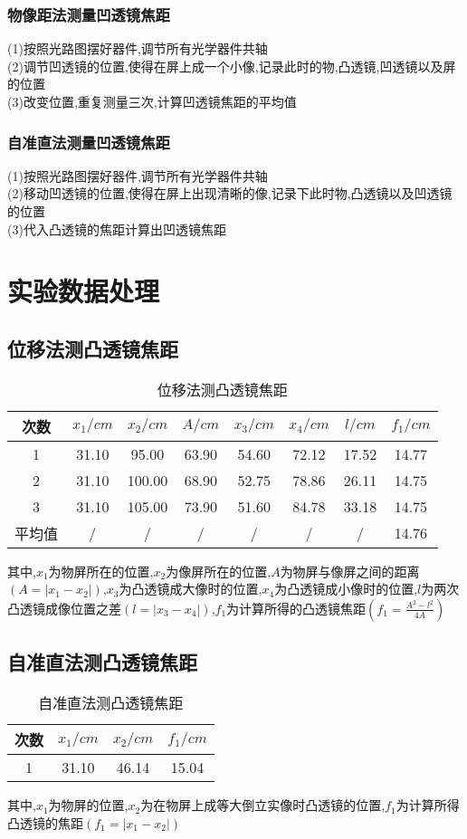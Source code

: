 \documentclass[a4 paper,12pt]{article}
\begin{document}
\subsubsection{物像距法测量凹透镜焦距}
\noindent
(1)按照光路图摆好器件,调节所有光学器件共轴\\
(2)调节凹透镜的位置,使得在屏上成一个小像,记录此时的物,凸透镜,凹透镜以及屏的位置\\
(3)改变位置,重复测量三次,计算凹透镜焦距的平均值
\subsubsection{自准直法测量凹透镜焦距}
\noindent
(1)按照光路图摆好器件,调节所有光学器件共轴\\
(2)移动凹透镜的位置,使得在屏上出现清晰的像,记录下此时物,凸透镜以及凹透镜的位置\\
(3)代入凸透镜的焦距计算出凹透镜焦距

\section{实验数据处理}

\subsection{位移法测凸透镜焦距}
\begin{table}[H] 
	\caption{位移法测凸透镜焦距}
	\label{位移法测凸透镜焦距}
	\centering
	\begin{tabular}{cccccccc}
		\toprule
		次数 & $x_{1}/cm$  & $x_{2}/cm $& $A/cm $ & $x_{3}/cm$  & $x_{4}/cm $ &$ l/cm$ & $f_{1}/cm $\\
		\midrule
		1 & 31.10  & 95.00  &63.90& 54.60  & 72.12&17.52&14.77  \\
		2 & 31.10  & 100.00  &68.90& 52.75  & 78.86&26.11&14.75  \\
		3 & 31.10  & 105.00  &73.90& 51.60  & 84.78&33.18&14.75  \\
		平均值&/&/&/&/&/&/&14.76  \\
		\bottomrule
	\end{tabular}
\end{table}
其中,$x_{1}$为物屏所在的位置,$x_{2}$为像屏所在的位置,$A$为物屏与像屏之间的距离$(A=|x_{1}-x_{2}|)$,$x_{3}$为凸透镜成大像时的位置,$x_{4}$为凸透镜成小像时的位置,$l$为两次凸透镜成像位置之差$(l=|x_{3}-x_{4}|)$,$f_{1}$为计算所得的凸透镜焦距$(f_{1}=\frac{A^{2}-l^{2}}{4A})$

\subsection{自准直法测凸透镜焦距}
\begin{table}[H] 
	\caption{自准直法测凸透镜焦距}
	\label{自准直法测凸透镜焦距}
	\centering
	\begin{tabular}{cccc}
		\toprule[0.5mm]
			次数&$x_{1}/cm$  &$x_{2}/cm$&$f_{1}/cm$  \\
			\midrule
			1&31.10&46.14&15.04 \\
			\bottomrule[0.4mm]
	\end{tabular}
\end{table}
其中,$x_{1}$为物屏的位置,$x_{2}$为在物屏上成等大倒立实像时凸透镜的位置,$f_{1}$为计算所得凸透镜的焦距$(f_{1}=|x_{1}-x_{2}|)$
\end{document}
